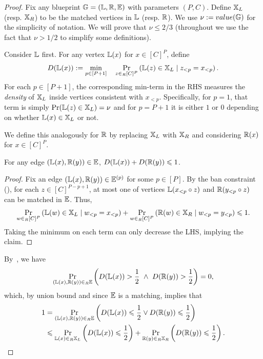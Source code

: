 \begin{proof}
Fix any blueprint $\mathbb{G}=(\mathbb{L},\mathbb{R},\mathbb{E})$ with parameters $(P,C)$. Define $\mathbb{X}_L$ (resp. $\mathbb{X}_R$) to be the matched vertices in $\mathbb{L}$ (resp. $\mathbb{R}$). 
We use $\nu := value(\mathbb{G})$ for the simplicity of notation. We will prove that $\nu \leq 2/3$ (throughout we use the fact that $\nu > 1/2$ to simplify some definitions). 

Consider $\mathbb{L}$ first. For any vertex $\mathbb{L}(x)$ for $x \in [C]^P$, define 
\[
	D(\mathbb{L}(x)) := \min_{p \in [P+1]} \quad \operatorname*{\textnormal{Pr}}_{z \in_R [C]^P}\left(\mathbb{L}(z) \in \mathbb{X}_L \mid z_{<p}=x_{<p}\right). 
\]
For each $p \in [P+1]$, the corresponding min-term in the RHS measures the \emph{density} of $\mathbb{X}_L$ inside vertices consistent with $x_{<p}$. Specifically, for $p=1$, that term is simply $\operatorname*{\textnormal{Pr}}(\mathbb{L}(z) \in \mathbb{X}_L) = \nu$ and for 
$p=P+1$ it is either $1$ or $0$ depending on whether $\mathbb{L}(x) \in \mathbb{X}_L$ or not. 

We define this analogously for $\mathbb{R}$ by replacing $\mathbb{X}_L$ with $\mathbb{X}_R$ and considering $\mathbb{R}(x)$ for $x \in [C]^P$.

\begin{claim}\label{clm:1}
	For any edge $(\mathbb{L}(x),\mathbb{R}(y)) \in \mathbb{E}$, $D(\mathbb{L}(x)) + D(\mathbb{R}(y)) \leqslant 1$. 
\end{claim}
\begin{proof}
	Fix an edge $(\mathbb{L}(x),\mathbb{R}(y)) \in \mathbb{E}^{(p)}$ for some $p \in [P]$. By the ban constraint (), for each $z \in [C]^{P-p+1}$, at most one of vertices
	$\mathbb{L}(x_{<p} \circ z)$ and $\mathbb{R}(y_{<p} \circ z)$ can be matched in $\mathbb{E}$. Thus, 
	\[
		\operatorname*{\textnormal{Pr}}_{w \in_R [C]^P}\left(\mathbb{L}(w) \in \mathbb{X}_L \mid w_{<p}=x_{<p}\right) + \operatorname*{\textnormal{Pr}}_{w \in_R [C]^P}\left(\mathbb{R}(w) \in \mathbb{X}_R \mid w_{<p}=y_{<p}\right) \leqslant 1. 
	\]
	Taking the minimum on each term can only decrease the LHS, implying the claim.  
	
\end{proof}

By~, we have
\[
	\operatorname*{\textnormal{Pr}}_{(\mathbb{L}(x),\mathbb{R}(y)) \in_R \mathbb{E}}\left(D(\mathbb{L}(x)) > \frac12 ~\wedge~ D(\mathbb{R}(y)) > \frac12\right) = 0, 
\]
which, by union bound and since $\mathbb{E}$ is a matching, implies that 
\begin{align}
	1 &= \operatorname*{\textnormal{Pr}}_{(\mathbb{L}(x),\mathbb{R}(y)) \in_R \mathbb{E}}\left(D(\mathbb{L}(x)) \leqslant \frac12 \vee D(\mathbb{R}(y)) \leqslant \frac12\right) \notag \\
	&\leqslant \operatorname*{\textnormal{Pr}}_{\mathbb{L}(x) \in_R \mathbb{X}_L}\left(D(\mathbb{L}(x)) \leqslant \frac12\right) + \operatorname*{\textnormal{Pr}}_{\mathbb{R}(y) \in_R \mathbb{X}_R}\left(D(\mathbb{R}(y)) \leqslant \frac12\right).\label{eq:one-side} 
\end{align}


\end{proof}
